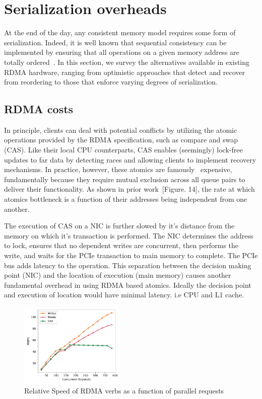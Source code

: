 \section{Serialization overheads}

At the end of the day, any consistent memory model requires some form
of serialization.  Indeed, it is well known that sequential
consistency can be implemented by ensuring that all operations on a
given memory address are totally ordered~\cite{ivy}.  In this section,
we survey the alternatives available in existing RDMA hardware, ranging from optimistic approaches that detect and recover from reordering to those that enforce varying degrees of serialization.

\subsection{RDMA costs}

In principle, clients can deal with potential conflicts by utilizing the atomic
operations provided by the RDMA specification, such as compare and swap (CAS).
Like their local CPU counterparts, CAS enables (seemingly) lock-free updates to
far data by detecting races and allowing clients to implement recovery
mechanisms. In practice, however, these atomics are
famously~\cite{design-guidelines,clover} expensive, fundamentally because they
require mutual exclusion across all queue pairs to deliver their functionality.
As shown in prior work~\cite{design-guidelines}[Figure. 14], the rate at which
atomics bottleneck is a function of their addresses being independent from one
another.

The execution of CAS on a NIC is further slowed by it's distance from the memory
on which it's transaction is performed. The NIC determines the address to lock,
ensures that no dependent writes are concurrent, then performs the write, and
waits for the PCIe transaction to main memory to complete. The PCIe bus adds
latency to the operation. This separation between the decision making point
(NIC) and the location of execution (main memory) causes another fundamental
overhead in using RDMA based atomics. Ideally the decision point and execution
of location would have minimal latency. i.e CPU and L1 cache.

\begin{figure}[t]
    \includegraphics[width=0.45\textwidth]{fig/rdma_concur.pdf}
    \caption{Relative Speed of RDMA verbs as a function of parallel requests}
    \label{fig:rdma_concur}
\end{figure}

